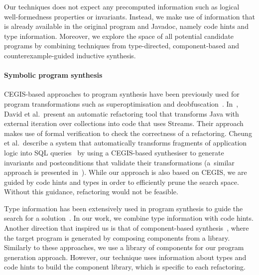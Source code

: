 \documentclass[sigconf,review,anonymous]{acmart}
\begin{document}
Our techniques does not expect any
precomputed information such as logical well-formedness properties or
invariants. Instead, we make use of information that is already
available in the original program and Javadoc, namely code hints and
type information. Moreover, we explore the space of all potential
candidate programs by combining techniques from type-directed,
component-based and counterexample-guided inductive synthesis.

\paragraph{Symbolic program synthesis}

CEGIS-based approaches to program synthesis have been previously used for
program transformations such as superoptimisation and
deobfuscation~\cite{DBLP:conf/icse/JhaGST10}. 
In~\cite{DBLP:journals/corr/abs-1712-07388}, David et al.~present an
automatic refactoring tool that transforms Java with external iteration over
collections into code that uses Streams.  Their approach makes use of formal
verification to check the correctness of a refactoring.  Cheung et
al.~describe a system that automatically transforms fragments of application
logic into SQL queries~\cite{DBLP:conf/pldi/CheungSM13} by using a
CEGIS-based synthesiser to generate invariants and postconditions that
validate their transformations (a~similar approach is presented
in~\cite{DBLP:conf/cc/IuCZ10}).  While our approach is also based on CEGIS,
we are guided by code hints and types in order to efficiently prune the
search space.  Without this guidance, refactoring would not be feasible.

%
Type information has been extensively used in program synthesis to guide the
search for a
solution~\cite{DBLP:conf/sfp/Katayama05,DBLP:conf/pldi/FeserCD15,DBLP:conf/pldi/OseraZ15,DBLP:journals/pacmpl/LubinCOC20,DBLP:journals/pacmpl/YamaguchiMDW21}. 
In our work, we combine type information with code hints.
%
%
%
Another direction that inspired us is that of component-based
synthesis~\cite{DBLP:conf/icse/JhaGST10,DBLP:conf/pldi/GulwaniJTV11,DBLP:conf/popl/FengM0DR17},
where the target program is generated by composing components from a
library.  Similarly to these approaches, we use a library of components for
our program generation approach.  However, our technique uses information
about types and code hints to build the component library, which is specific
to each refactoring.
\end{document}

